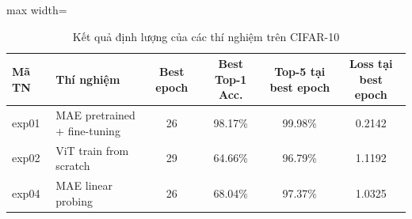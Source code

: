 \begin{table}[H]
    \centering
    \begin{adjustbox}{max width=\textwidth}
    \begin{tabular}{llcccc}
        \toprule
        Mã TN & Thí nghiệm & Best epoch & Best Top-1 Acc. & Top-5 tại best epoch & Loss tại best epoch \\
        \midrule
        exp01 & MAE pretrained + fine-tuning & 26 & 98.17\% & 99.98\% & 0.2142 \\
        exp02 & ViT train from scratch & 29 & 64.66\% & 96.79\% & 1.1192 \\
        exp04 & MAE linear probing & 26 & 68.04\% & 97.37\% & 1.0325 \\
        \bottomrule
    \end{tabular}
    \end{adjustbox}
    \caption{Kết quả định lượng của các thí nghiệm trên CIFAR-10}
    \label{tab:group_cifar10_results}
\end{table}
